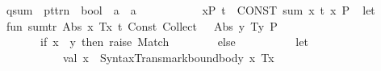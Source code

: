 \begin{isabellebody}
\isamarkupfalse%
\isanewline
\ \ {\isachardoublequoteopen}{\isacharunderscore}{\kern0pt}qsum{\isachardoublequoteclose}\ {\isacharcolon}{\kern0pt}{\isacharcolon}{\kern0pt}\ {\isachardoublequoteopen}pttrn\ {\isasymRightarrow}\ bool\ {\isasymRightarrow}\ {\isacharprime}{\kern0pt}a\ {\isasymRightarrow}\ {\isacharprime}{\kern0pt}a{\isachardoublequoteclose}\ \ {\isacharparenleft}{\kern0pt}{\isachardoublequoteopen}{\isacharparenleft}{\kern0pt}{}{\isasymSum}{\isacharunderscore}{\kern0pt}\ {\isacharbar}{\kern0pt}\ {\isacharparenleft}{\kern0pt}{\isacharunderscore}{\kern0pt}{\isacharparenright}{\kern0pt}{\isachardot}{\kern0pt}{\isacharslash}{\kern0pt}\ {\isacharunderscore}{\kern0pt}{\isacharparenright}{\kern0pt}{\isachardoublequoteclose}\ {\isacharbrackleft}{\kern0pt}{}{\isacharcomma}{\kern0pt}\ {}{\isacharcomma}{\kern0pt}\ {}{}{\isacharbrackright}{\kern0pt}\ {}{}{\isacharparenright}{\kern0pt}\isanewline
{}\isamarkupfalse%
\isanewline
\ \ {\isachardoublequoteopen}{\isasymSum}x{\isacharbar}{\kern0pt}P{\isachardot}{\kern0pt}\ t{\isachardoublequoteclose}\ {\isacharequal}{\kern0pt}{\isachargreater}{\kern0pt}\ {\isachardoublequoteopen}CONST\ sum\ {\isacharparenleft}{\kern0pt}{\isasymlambda}x{\isachardot}{\kern0pt}\ t{\isacharparenright}{\kern0pt}\ {\isacharbraceleft}{\kern0pt}x{\isachardot}{\kern0pt}\ P{\isacharbraceright}{\kern0pt}{\isachardoublequoteclose}\isanewline
%
\isadelimML
\isanewline
%
\endisadelimML
%
\isatagML
{}\isamarkupfalse%
\ {\isacartoucheopen}\isanewline
let\isanewline
\ \ fun\ sum{\isacharunderscore}{\kern0pt}tr{\isacharprime}{\kern0pt}\ {\isacharbrackleft}{\kern0pt}Abs\ {\isacharparenleft}{\kern0pt}x{\isacharcomma}{\kern0pt}\ Tx{\isacharcomma}{\kern0pt}\ t{\isacharparenright}{\kern0pt}{\isacharcomma}{\kern0pt}\ Const\ {\isacharparenleft}{\kern0pt}\isactrlconstUNDERSCOREsyntax {\isasymopen}Collect{\isasymclose}{\isacharcomma}{\kern0pt}\ {\isacharunderscore}{\kern0pt}{\isacharparenright}{\kern0pt}\ {\isachardollar}{\kern0pt}\ Abs\ {\isacharparenleft}{\kern0pt}y{\isacharcomma}{\kern0pt}\ Ty{\isacharcomma}{\kern0pt}\ P{\isacharparenright}{\kern0pt}{\isacharbrackright}{\kern0pt}\ {\isacharequal}{\kern0pt}\isanewline
\ \ \ \ \ \ \ \ if\ x\ {\isacharless}{\kern0pt}{\isachargreater}{\kern0pt}\ y\ then\ raise\ Match\isanewline
\ \ \ \ \ \ \ \ else\isanewline
\ \ \ \ \ \ \ \ \ \ let\isanewline
\ \ \ \ \ \ \ \ \ \ \ \ val\ x{\isacharprime}{\kern0pt}\ {\isacharequal}{\kern0pt}\ Syntax{\isacharunderscore}{\kern0pt}Trans{\isachardot}{\kern0pt}mark{\isacharunderscore}{\kern0pt}bound{\isacharunderscore}{\kern0pt}body\ {\isacharparenleft}{\kern0pt}x{\isacharcomma}{\kern0pt}\ Tx{\isacharparenright}{\kern0pt}{\isacharsemicolon}{\kern0pt}\isanewline

\end{isabellebody}
